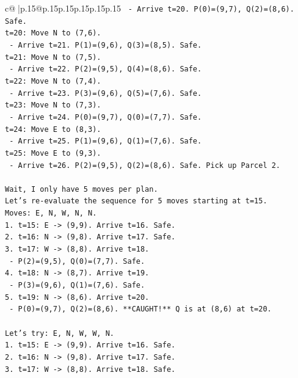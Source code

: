 \documentclass{article}
\begin{document}
{\begin{supertabular}{c@{$\;$}|p{.15\linewidth}@{}p{.15\linewidth}p{.15\linewidth}p{.15\linewidth}p{.15\linewidth}p{.15\linewidth}}
{{{\texttt{  {-} Arrive t=20. P(0)=(9,7), Q(2)=(8,6). Safe.} \\
\texttt{t=20: Move N to (7,6).} \\
\texttt{  {-} Arrive t=21. P(1)=(9,6), Q(3)=(8,5). Safe.} \\
\texttt{t=21: Move N to (7,5).} \\
\texttt{  {-} Arrive t=22. P(2)=(9,5), Q(4)=(8,6). Safe.} \\
\texttt{t=22: Move N to (7,4).} \\
\texttt{  {-} Arrive t=23. P(3)=(9,6), Q(5)=(7,6). Safe.} \\
\texttt{t=23: Move N to (7,3).} \\
\texttt{  {-} Arrive t=24. P(0)=(9,7), Q(0)=(7,7). Safe.} \\
\texttt{t=24: Move E to (8,3).} \\
\texttt{  {-} Arrive t=25. P(1)=(9,6), Q(1)=(7,6). Safe.} \\
\texttt{t=25: Move E to (9,3).} \\
\texttt{  {-} Arrive t=26. P(2)=(9,5), Q(2)=(8,6). Safe. Pick up Parcel 2.} \\
\\ 
\texttt{Wait, I only have 5 moves per plan.} \\
\texttt{Let's re{-}evaluate the sequence for 5 moves starting at t=15.} \\
\texttt{Moves: E, N, W, N, N.} \\
\texttt{1. t=15: E {-}> (9,9). Arrive t=16. Safe.} \\
\texttt{2. t=16: N {-}> (9,8). Arrive t=17. Safe.} \\
\texttt{3. t=17: W {-}> (8,8). Arrive t=18.} \\
\texttt{   {-} P(2)=(9,5), Q(0)=(7,7). Safe.} \\
\texttt{4. t=18: N {-}> (8,7). Arrive t=19.} \\
\texttt{   {-} P(3)=(9,6), Q(1)=(7,6). Safe.} \\
\texttt{5. t=19: N {-}> (8,6). Arrive t=20.} \\
\texttt{   {-} P(0)=(9,7), Q(2)=(8,6). **CAUGHT!** Q is at (8,6) at t=20.} \\
\\ 
\texttt{Let's try: E, N, W, W, N.} \\
\texttt{1. t=15: E {-}> (9,9). Arrive t=16. Safe.} \\
\texttt{2. t=16: N {-}> (9,8). Arrive t=17. Safe.} \\
\texttt{3. t=17: W {-}> (8,8). Arrive t=18. Safe.} \\
}}}
\end{supertabular}}
\end{document}
